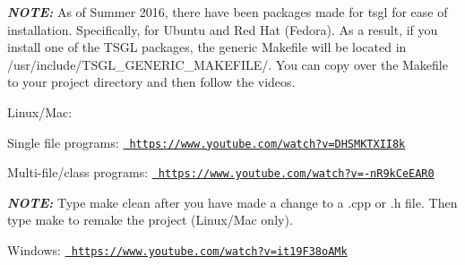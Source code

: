 {\itshape {\bfseries{N\+O\+TE\+:}}} As of Summer 2016, there have been packages made for tsgl for ease of installation. Specifically, for Ubuntu and Red Hat (Fedora). As a result, if you install one of the T\+S\+GL packages, the generic {\ttfamily Makefile} will be located in {\ttfamily /usr/include/\+T\+S\+G\+L\+\_\+\+G\+E\+N\+E\+R\+I\+C\+\_\+\+M\+A\+K\+E\+F\+I\+L\+E/}. You can copy over the {\ttfamily Makefile} to your project directory and then follow the videos.

Linux/\+Mac\+:


\begin{DoxyItemize}
\item Single file programs\+: \href{https://www.youtube.com/watch?v=DHSMKTXII8k}{\texttt{ https\+://www.\+youtube.\+com/watch?v=\+D\+H\+S\+M\+K\+T\+X\+I\+I8k}}
\item Multi-\/file/class programs\+: \href{https://www.youtube.com/watch?v=-nR9kCeEAR0}{\texttt{ https\+://www.\+youtube.\+com/watch?v=-\/n\+R9k\+Ce\+E\+A\+R0}}
\end{DoxyItemize}

{\itshape {\bfseries{N\+O\+TE\+:}}} Type {\ttfamily make clean} after you have made a change to a {\ttfamily .cpp} or {\ttfamily .h} file. Then type {\ttfamily make} to remake the project (Linux/\+Mac only).

Windows\+: \href{https://www.youtube.com/watch?v=it19F38oAMk}{\texttt{ https\+://www.\+youtube.\+com/watch?v=it19\+F38o\+A\+Mk}} 